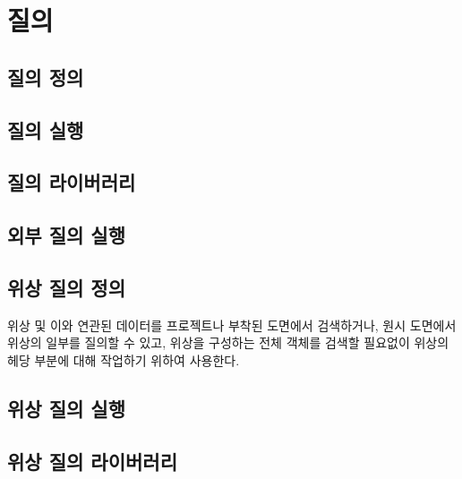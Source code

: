 \documentclass[12pt,a4paper,oneside]{book}
\begin{document}
	
\newpage
\chapter{질의}


	\newpage
	\section{질의 정의}
	

	\newpage
	\section{질의 실행}
	
	
	\newpage
	\section{질의 라이버러리}
	
	
	\newpage
	\section{외부 질의 실행}
	
	
	\newpage
	\section{위상 질의 정의}
	
	위상 및 이와 연관된 데이터를 프로젝트나 부착된 도면에서 검색하거나, 
	원시 도면에서 위상의 일부를 질의할 수 있고, 
	위상을 구성하는 전체 객체를 검색할 필요없이 위상의 헤당 부분에 대해 작업하기 위하여 사용한다.
	
	
	\newpage
	\section{위상 질의 실행}
	
	\newpage
	\section{위상 질의 라이버러리}
	
\end{document}
